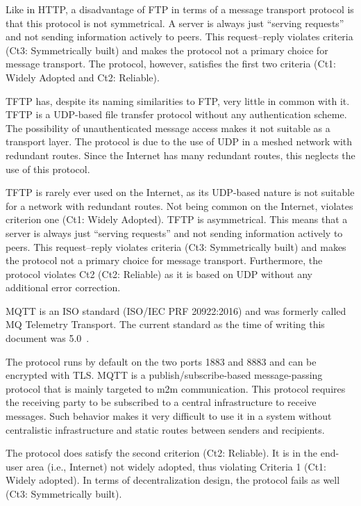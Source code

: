 Like in HTTP, a disadvantage of FTP in terms of a message transport protocol is that this protocol is not symmetrical. A server is always just ``serving requests'' and not sending information actively to peers. This request--reply violates criteria (Ct3: Symmetrically built) and makes the protocol not a primary choice for message transport. The protocol, however, satisfies the first two criteria (Ct1: Widely Adopted and Ct2: Reliable).

TFTP has, despite its naming similarities to FTP, very little in common with it. TFTP is a UDP-based file transfer protocol without any authentication scheme. The possibility of unauthenticated message access makes it not suitable as a transport layer. The protocol is due to the use of UDP in a meshed network with redundant routes. Since the Internet has many redundant routes, this neglects the use of this protocol.

TFTP is rarely ever used on the Internet, as its UDP-based nature is not suitable for a network with redundant routes. Not being common on the Internet, violates criterion one (Ct1: Widely Adopted). TFTP is asymmetrical. This means that a server is always just ``serving requests'' and not sending information actively to peers. This request--reply violates criteria (Ct3: Symmetrically built) and makes the protocol not a primary choice for message transport. Furthermore, the protocol violates Ct2 (Ct2: Reliable) as it is based on UDP without any additional error correction.

MQTT is an ISO standard (ISO/IEC PRF 20922:2016) and was formerly called MQ Telemetry Transport. The current standard as the time of writing this document was 5.0~\cite{mqtt}. 

The protocol runs by default on the two ports 1883 and 8883 and can be encrypted with TLS. MQTT is a publish/subscribe-based message-passing protocol that is mainly targeted to m2m communication. This protocol requires the receiving party to be subscribed to a central infrastructure to receive messages. Such behavior makes it very difficult to use it in a system without centralistic infrastructure and static routes between senders and recipients. 

The protocol does satisfy the second criterion (Ct2: Reliable). It is in the end-user area (i.e., Internet) not widely adopted, thus violating Criteria 1 (Ct1: Widely adopted). In terms of decentralization design, the protocol fails as well (Ct3: Symmetrically built).

